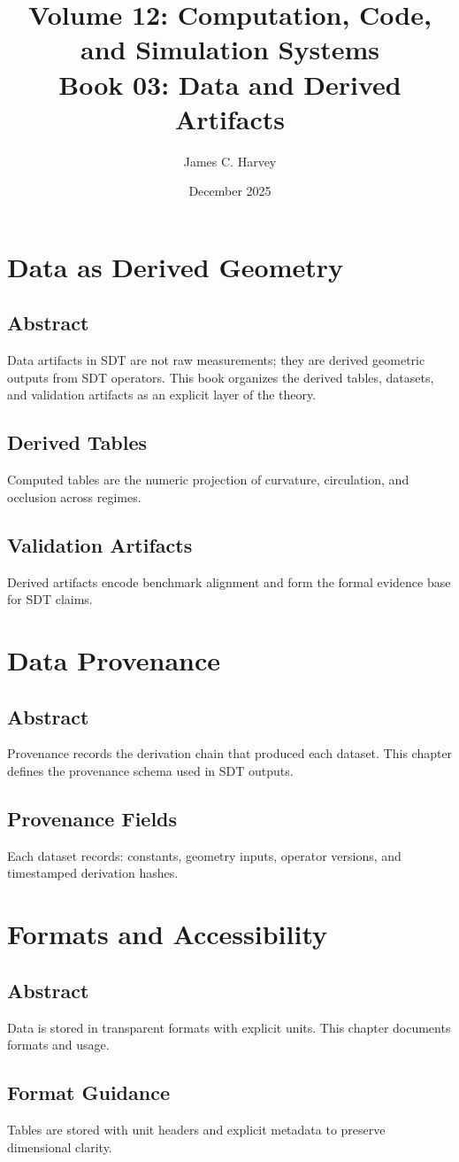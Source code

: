 \documentclass[12pt]{book}
\title{Volume 12: Computation, Code, and Simulation Systems \\ Book 03: Data and Derived Artifacts}
\author{James C. Harvey}
\date{December 2025}
\begin{document}
\maketitle
\tableofcontents

\chapter{Data as Derived Geometry}

\section*{Abstract}
Data artifacts in SDT are not raw measurements; they are derived geometric outputs from SDT operators.
This book organizes the derived tables, datasets, and validation artifacts as an explicit layer of the
theory.

\section{Derived Tables}
Computed tables are the numeric projection of curvature, circulation, and occlusion across regimes.

\section{Validation Artifacts}
Derived artifacts encode benchmark alignment and form the formal evidence base for SDT claims.

\chapter{Data Provenance}

\section*{Abstract}
Provenance records the derivation chain that produced each dataset. This chapter defines the provenance
schema used in SDT outputs.

\section{Provenance Fields}
Each dataset records: constants, geometry inputs, operator versions, and timestamped derivation hashes.

\chapter{Formats and Accessibility}

\section*{Abstract}
Data is stored in transparent formats with explicit units. This chapter documents formats and usage.

\section{Format Guidance}
Tables are stored with unit headers and explicit metadata to preserve dimensional clarity.
\end{document}
